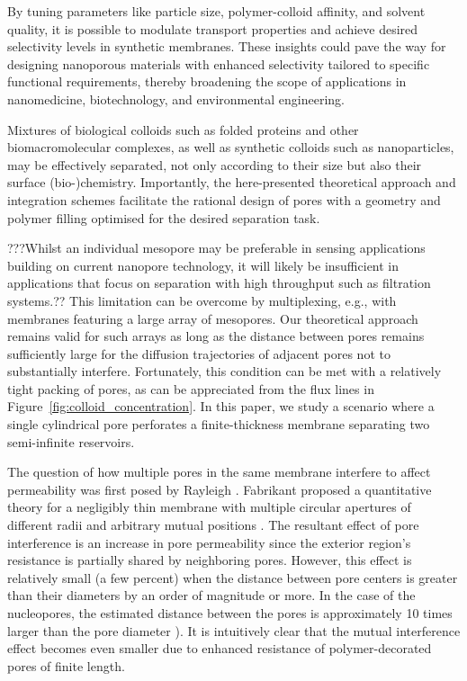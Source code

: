 \documentclass[12pt, a4paper]{article}
\begin{document}
By tuning parameters like particle size, polymer-colloid affinity, and solvent quality, it is possible to modulate transport properties and achieve desired selectivity levels in synthetic membranes.
These insights could pave the way for designing nanoporous materials with enhanced selectivity tailored to specific functional requirements, thereby broadening the scope of applications in nanomedicine, biotechnology, and environmental engineering.

Mixtures of biological colloids such as folded proteins and other biomacromolecular complexes, as well as synthetic colloids such as nanoparticles, may be effectively separated, not only according to their size but also their surface (bio-)chemistry.
Importantly, the here-presented theoretical approach and integration schemes facilitate the rational design of pores with a geometry and polymer filling optimised for the desired separation task.

???Whilst an individual mesopore may be preferable in sensing applications building on current nanopore technology, it will likely be insufficient in applications that focus on separation with high throughput such as filtration systems.??
This limitation can be overcome by multiplexing, e.g., with membranes featuring a large array of mesopores.
Our theoretical approach remains valid for such arrays as long as the distance between pores remains sufficiently large for the diffusion trajectories of adjacent pores not to substantially interfere.
Fortunately, this condition can be met with a relatively tight packing of pores, as can be appreciated from the flux lines in  Figure~\ref{fig:colloid_concentration}.
In this paper, we study a scenario where a single cylindrical pore perforates a finite-thickness membrane separating two semi-infinite reservoirs.

The question of how multiple pores in the same membrane interfere to affect permeability was first posed by Rayleigh \cite{Strutt1878}.
Fabrikant proposed a quantitative theory for a negligibly thin membrane with multiple circular apertures of different radii and arbitrary mutual positions \cite{Fabrikant1985}.
The resultant effect of pore interference is an increase in pore permeability since the exterior region's resistance is partially shared by neighboring pores.
However, this effect is relatively small (a few percent) when the distance between pore centers is greater than their diameters by an order of magnitude or more. In the case of the nucleopores, the estimated distance between the pores is approximately 10 times larger than the pore diameter \cite{Yang2004, Daigle2001, Feldherr1984, Kubitscheck2000}). 
It is intuitively clear that the mutual interference effect becomes even smaller due to enhanced resistance of polymer-decorated pores of finite  length.
\end{document}
